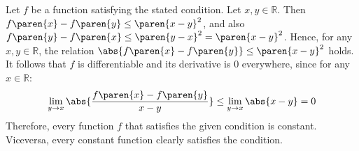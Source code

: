 Let $f$ be a function satisfying the stated condition.
Let $x, y \in \mathbb{R}$.
Then $f\paren{x} - f\paren{y} \leq \paren{x - y}^{2}$,
and also $f\paren{y} - f\paren{x} \leq \paren{y - x}^{2} = \paren{x - y}^{2}$.
Hence, for any $x, y \in \mathbb{R}$, the relation
$\abs{f\paren{x} - f\paren{y}} \leq \paren{x - y}^{2}$ holds.
\newline
It follows that $f$ is differentiable and its derivative is $0$ everywhere,
since for any $x \in \mathbb{R}$:
\begin{equation*}
  \lim\limits_{y \to x} {\abs{\frac{f\paren{x} - f\paren{y}}{x - y}}}
  \leq \lim\limits_{y \to x} {\abs{x - y}}
  = 0
\end{equation*}
Therefore, every function $f$ that satisfies the given condition is constant.
Viceversa, every constant function clearly satisfies the condition.
